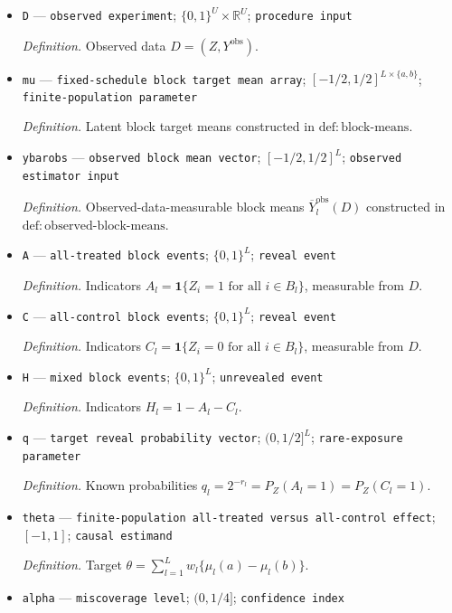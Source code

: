 \documentclass{article}
\begin{document}
\begin{itemize}
  \item \texttt{D} --- \texttt{observed experiment}; \(\{0,1\}^U\times\mathbb R^U\); \texttt{procedure input}
  \par\smallskip\noindent\emph{Definition.} Observed data \(D=(Z,Y^{\mathrm{obs}})\).
  \item \texttt{mu} --- \texttt{fixed-\allowbreak{}schedule block target mean array}; \([-1/2,1/2]^{L\times\{a,b\}}\); \texttt{finite-\allowbreak{}population parameter}
  \par\smallskip\noindent\emph{Definition.} Latent block target means constructed in \(\mathrm{def{:}block\text{-}means}\).
  \item \texttt{ybarobs} --- \texttt{observed block mean vector}; \([-1/2,1/2]^L\); \texttt{observed estimator input}
  \par\smallskip\noindent\emph{Definition.} Observed-data-measurable block means \(\overline Y_l^{\mathrm{obs}}(D)\) constructed in \(\mathrm{def{:}observed\text{-}block\text{-}means}\).
  \item \texttt{A} --- \texttt{all-\allowbreak{}treated block events}; \(\{0,1\}^L\); \texttt{reveal event}
  \par\smallskip\noindent\emph{Definition.} Indicators \(A_l=\mathbf 1\{Z_i=1\text{ for all }i\in B_l\}\), measurable from \(D\).
  \item \texttt{C} --- \texttt{all-\allowbreak{}control block events}; \(\{0,1\}^L\); \texttt{reveal event}
  \par\smallskip\noindent\emph{Definition.} Indicators \(C_l=\mathbf 1\{Z_i=0\text{ for all }i\in B_l\}\), measurable from \(D\).
  \item \texttt{H} --- \texttt{mixed block events}; \(\{0,1\}^L\); \texttt{unrevealed event}
  \par\smallskip\noindent\emph{Definition.} Indicators \(H_l=1-A_l-C_l\).
  \item \texttt{q} --- \texttt{target reveal probability vector}; \((0,1/2]^L\); \texttt{rare-\allowbreak{}exposure parameter}
  \par\smallskip\noindent\emph{Definition.} Known probabilities \(q_l=2^{-r_l}=P_Z(A_l=1)=P_Z(C_l=1)\).
  \item \texttt{theta} --- \texttt{finite-\allowbreak{}population all-\allowbreak{}treated versus all-\allowbreak{}control effect}; \([-1,1]\); \texttt{causal estimand}
  \par\smallskip\noindent\emph{Definition.} Target \(\theta=\sum_{l=1}^Lw_l\{\mu_l(a)-\mu_l(b)\}\).
  \item \texttt{alpha} --- \texttt{miscoverage level}; \((0,1/4]\); \texttt{confidence index}

\end{itemize}
\end{document}

